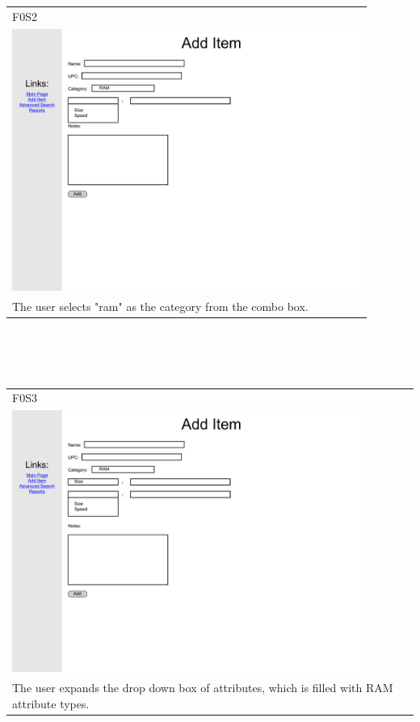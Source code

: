 \documentclass{article}
\begin{document}
~\\
~\\
\begin{tabular}{ p{4.5in} }
F0S2\\
\includegraphics[keepaspectratio, width=4.5in]{addItemF0S2.pdf}  \\
The user selects "ram" as the category from the combo box.
\end{tabular}\\
~\\
~\\
\begin{tabular}{ p{4.5in} }
F0S3\\
\includegraphics[keepaspectratio, width=4.5in]{addItemF0S3.pdf}\\
The user expands the drop down box of attributes, which is filled with RAM attribute types.
\end{tabular}\\
~\\
\end{document}
